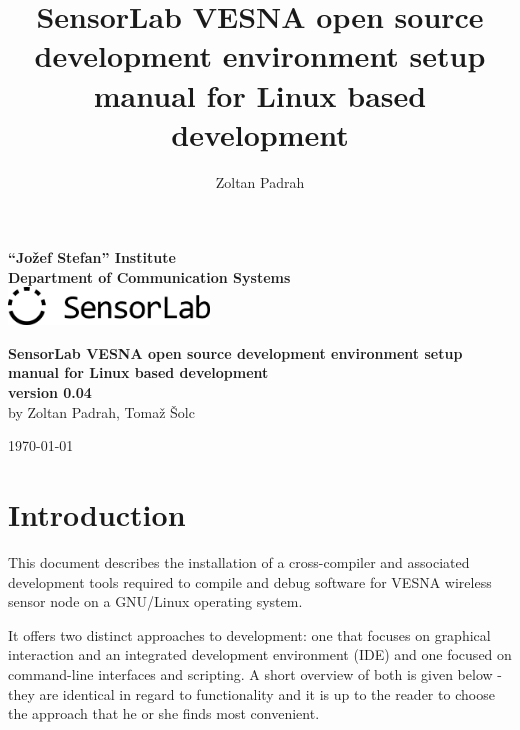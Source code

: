 \documentclass[a4paper, 10pt]{article}
\title{SensorLab VESNA open source development environment setup manual for Linux based development}
\author{Zoltan Padrah}
\begin{document}
\begin{titlepage}
    \begin{center}
    \textbf{
        \Large ``Jožef Stefan'' Institute \\[2mm]
        Department of Communication Systems\\[2mm]
        \includegraphics[height=1cm]{./install-guide-linux-images/sensorlab-logo.png}
        }\\

    \vfill

    \textbf{\huge SensorLab VESNA open source development environment setup manual
        for Linux based development}\\[1.5cm]


    \textbf{ \Large
    version 0.04}\\[1cm]
    
    \textnormal{\Large
    by Zoltan Padrah, Tomaž Šolc}\\[1cm]
    
    \vfill

    \textnormal{\large
    \today\\[1cm]
    }
    \end{center}
\end{titlepage}


\section{Introduction}

This document describes the installation of a cross-compiler and associated
development tools required to compile and debug software for VESNA wireless
sensor node on a GNU/Linux operating system.

It offers two distinct approaches to development: one that focuses on graphical
interaction and an integrated development environment (IDE) and one focused on
command-line interfaces and scripting. A short overview of both is given below
- they are identical in regard to functionality and it is up to the reader to
choose the approach that he or she finds most convenient.
\end{document}
